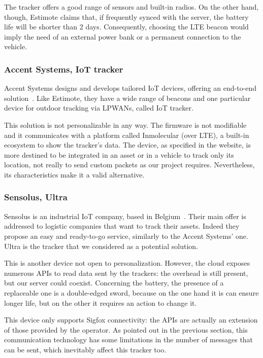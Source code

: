 The tracker offers a good range of sensors and built-in radios. On the other hand, though, Estimote claims that, if frequently synced with the server, the battery life will be shorter than 2 days. Consequently, choosing the LTE beacon would imply the need of an external power bank or a permanent connection to the vehicle.

\subsubsection{Accent Systems, IoT tracker}
Accent Systems designs and develops tailored IoT devices, offering an end-to-end solution~\cite{accentsys}. Like Estimote, they have a wide range of beacons and one particular device for outdoor tracking via LPWANs, called IoT tracker.

This solution is not personalizable in any way. The firmware is not modifiable and it communicates with a platform called Inmolecular (over LTE), a built-in ecosystem to show the tracker's data. The device, as specified in the website, is more destined to be integrated in an asset or in a vehicle to track only its location, not really to send custom packets as our project requires. Nevertheless, its characteristics make it a valid alternative.

\subsubsection{Sensolus, Ultra}
Sensolus is an industrial IoT company, based in Belgium~\cite{sensolus}. Their main offer is addressed to logistic companies that want to track their assets. Indeed they propose an easy and ready-to-go service, similarly to the Accent Systems' one. Ultra is the tracker that we considered as a potential solution.

This is another device not open to personalization. However, the cloud exposes numerous APIs to read data sent by the trackers: the overhead is still present, but our server could coexist. Concerning the battery, the presence of a replaceable one is a double-edged sword, because on the one hand it is can ensure longer life, but on the other it requires an action to change it.

This device only supports Sigfox connectivity: the APIs are actually an extension of those provided by the operator. As pointed out in the previous section, this communication technology has some limitations in the number of messages that can be sent, which inevitably affect this tracker too.

